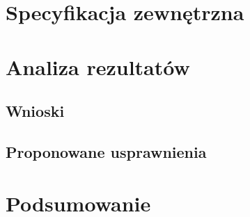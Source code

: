 \chapter{Specyfikacja zewnętrzna}\label{Chapter_SpecyfikacjaZewnetrzna}

\chapter{Analiza rezultatów}\label{Chapter_AnalizaRezultatow}

\section{Wnioski}\label{Section_Wnioski}

\section{Proponowane usprawnienia}\label{Section_Usprawnienia}
\cite{HandOverFaceOcclusion07}

\chapter{Podsumowanie}\label{Section_Podsumowanie}